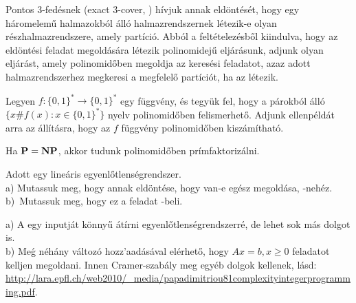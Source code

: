\begin{Exercise}[counter={sorszam}, difficulty=-1]
	 Pontos 3-fedésnek (exact 3-cover, ) hívjuk annak eldöntését, hogy egy háromelemű halmazokból álló halmazrendszernek létezik-e olyan részhalmazrendszere, amely partíció. Abból a feltételezésből kiindulva, hogy az  eldöntési feladat megoldására létezik polinomidejű eljárásunk, adjunk olyan eljárást, amely polinomidőben megoldja az  keresési feladatot, azaz adott halmazrendszerhez megkeresi a megfelelő partíciót, ha az létezik.
\end{Exercise}


\begin{Exercise}[counter={sorszam}, difficulty=0]
	 Legyen $f: \{0,1\}^\ast \rightarrow \{0,1\}^\ast$ egy függvény, és tegyük fel, hogy a párokból álló $\{ x \# f(x): x \in \{0,1\}^\ast\}$ nyelv polinomidőben felismerhető. Adjunk ellenpéldát arra az állításra, hogy az $f$ függvény polinomidőben kiszámítható.
\end{Exercise}





\begin{Exercise}[counter={sorszam}, difficulty=0]
	Ha $\mbox{\ensuremath{\mathbf{P}}}=\mbox{\ensuremath{\mathbf{NP}}}$, akkor tudunk polinomidőben prímfaktorizálni.
	
\end{Exercise}




\begin{Exercise}[counter={sorszam}, difficulty=0]
	Adott egy line\'aris egyenl\H otlens\'egrendszer.\\
	a) Mutassuk meg, hogy annak eldöntése, hogy van-e eg\'esz megold\'asa, \NP-neh\'ez.\\
	b)~\hard Mutassuk meg, hogy ez a feladat \NP-beli.
\end{Exercise}	
\begin{Answer}
	a) A \SAT egy inputj\'at k\"onny\H u \'at\'irni egyenl\H otlens\'egrendszerr\'e, de lehet sok m\'as dolgot is.\\
	b) Me\'g n\'eh\'any v\'altoz\'o hozz'aad\'as\'aval el\'erhet\H o, hogy $Ax=b, x\ge 0$ feladatot kelljen megoldani.
	Innen Cramer-szab\'aly meg egy\'eb dolgok kellenek, l\'asd: \url{http://lara.epfl.ch/web2010/_media/papadimitriou81complexityintegerprogramming.pdf}.
\end{Answer}

